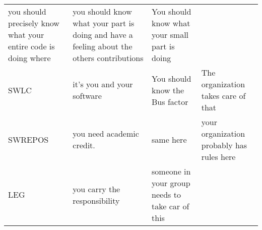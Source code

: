 \documentclass[a4paper
]{article}
\begin{document}
\begin{landscape}
\begin{longtable}[]{@{}llll@{}}
\begin{minipage}[t]{0.28\columnwidth}
you should precisely know what your entire code is doing where\strut
\end{minipage} & \begin{minipage}[t]{0.28\columnwidth}\raggedright
you should know what your part is doing and have a feeling about the
others contributions\strut
\end{minipage} & \begin{minipage}[t]{0.14\columnwidth}\raggedright
You should know what your small part is doing\strut
\end{minipage}\tabularnewline
\begin{minipage}[t]{0.19\columnwidth}\raggedright
SWLC\strut
\end{minipage} & \begin{minipage}[t]{0.28\columnwidth}\raggedright
it's you and your software\strut
\end{minipage} & \begin{minipage}[t]{0.28\columnwidth}\raggedright
You should know the Bus factor\strut
\end{minipage} & \begin{minipage}[t]{0.14\columnwidth}\raggedright
The organization takes care of that\strut
\end{minipage}\tabularnewline
\begin{minipage}[t]{0.19\columnwidth}\raggedright
SWREPOS\strut
\end{minipage} & \begin{minipage}[t]{0.28\columnwidth}\raggedright
you need academic credit.\strut
\end{minipage} & \begin{minipage}[t]{0.28\columnwidth}\raggedright
same here\strut
\end{minipage} & \begin{minipage}[t]{0.14\columnwidth}\raggedright
your organization probably has rules here\strut
\end{minipage}\tabularnewline
\begin{minipage}[t]{0.19\columnwidth}\raggedright
LEG\strut
\end{minipage} & \begin{minipage}[t]{0.28\columnwidth}\raggedright
you carry the responsibility\strut
\end{minipage} & \begin{minipage}[t]{0.28\columnwidth}\raggedright
someone in your group needs to take car of this\strut
\end{minipage} & \begin{minipage}[t]{0.14\columnwidth}\raggedright

\end{minipage}
\end{longtable}
\end{landscape}
\end{document}
